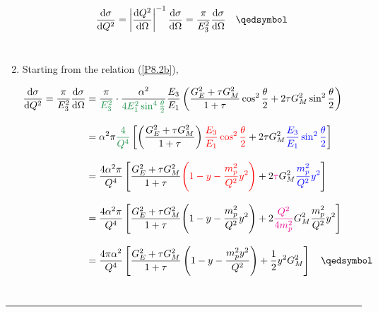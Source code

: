 \begin{solution}
\begin{enumerate}[label=(\alph*)]
                \begin{align}
                    \frac{\dif \sigma}{\dif Q^2} = \left|  \frac{\dif Q^2}{\dif \Omega} \right|^{-1} \frac{\dif \sigma }{\dif \Omega} = \frac{\pi}{E_3^2} \frac{\dif\sigma}{\dif\Omega} \qed \label{P8.2b}
                \end{align}\\
                \item Starting from the relation (\ref{P8.2b}), 
                
                    \begin{align*}
                        \frac{\dif \sigma}{\dif Q^2} = \frac{\pi}{E_3^2} \frac{\dif \sigma}{\dif \Omega} &= \frac{\pi}{\color{pinegreen} E_3^2} \cdot  \frac{\alpha^2}{\color{pinegreen} 4E_1^2 \sin^4\halftheta} \frac{E_3}{E_1} \left( \frac{G_E^2+\tau G_M^2}{1+\tau} \cos^2 \halftheta + 2\tau G_M^2 \sin^2\halftheta \right) \\[0.12in]
                        &=  \alpha^2 \pi {\color{pinegreen} \frac{4}{Q^4} }\left[ \left( \frac{G_E^2+\tau G_M^2}{1+\tau} \right) {\color{red} \frac{E_3}{E_1}  \cos^2 \halftheta }+ 2\tau G_M^2 {\color{blue} \frac{E_3}{E_1}  \sin^2\halftheta} \right] \\[0.12in]
                        &=   {  \frac{4 \alpha^2 \pi }{Q^4} }\left[   \frac{G_E^2+\tau G_M^2}{1+\tau}  {\color{red} \left( 1-y-\frac{m_p^2}{Q^2}y^2 \right) }+ 2{\color{magenta} \tau} G_M^2 {\color{blue} \frac{m_p^2}{Q^2}y^2 } \right] \\[0.12in]
                        &=  {  \frac{4 \alpha^2 \pi }{Q^4} }\left[   \frac{G_E^2+\tau G_M^2}{1+\tau}  { \left( 1-y-\frac{m_p^2}{Q^2}y^2 \right) }+ 2{\color{magenta} \frac{Q^2}{4m_p^2}} G_M^2 {  \frac{m_p^2}{Q^2}y^2 } \right] \\[0.12in]
                        &=  \frac{4\pi\alpha^2}{Q^4} \left[ \frac{G_E^2 + \tau G_M^2}{1+\tau} \left( 1 - y - \frac{m_p^2 y^2}{Q^2} \right) + \frac{1}{2}y^2 G_M^2 \right] \qed
                    \end{align*}\\
    \end{enumerate}
\end{solution}

\noindent\rule{7in}{1.5pt}


